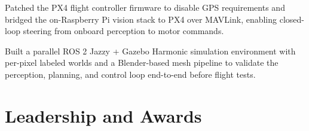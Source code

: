 \documentclass[letterpaper,11pt]{article}
\newcommand{\resumeItem}[1]{\item\small #1}
\begin{document}
\begin{resumeSubHeadingList}
\begin{resumeItemList}
            \resumeItem{Patched the PX4 flight controller firmware to disable GPS requirements and bridged the on-Raspberry Pi vision stack to PX4 over MAVLink, enabling closed-loop steering from onboard perception to motor commands.}
            \resumeItem{Built a parallel ROS 2 Jazzy + Gazebo Harmonic simulation environment with per-pixel labeled worlds and a Blender-based mesh pipeline to validate the perception, planning, and control loop end-to-end before flight tests.}
        \end{resumeItemList}
\end{resumeSubHeadingList}

\section{Leadership and Awards}
\end{document}
